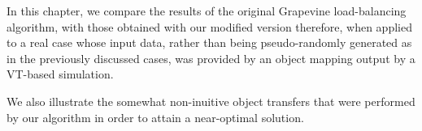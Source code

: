 In this chapter, we compare the results of the original Grapevine load-balancing algorithm,
with those obtained with our modified version therefore, when applied to a real
case whose input data, rather than being pseudo-randomly generated as in the previously
discussed cases, was provided by an object mapping output by a VT-based simulation.

We also illustrate the somewhat non-inuitive object transfers that were performed by our
algorithm in order to attain a near-optimal solution.
